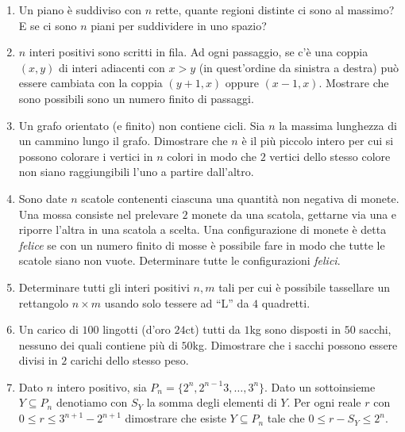 \documentclass[a4paper,10pt]{article}
\begin{document}
\begin{enumerate}
	Nel mese di gennaio, lo gnomo Gennaio va a trovare tutti i suoi amici.  Se nota che la maggioranza stretta dei suoi amici ha la casetta di un colore diverso dalla sua, allora entro la fine del mese egli ridipinge la sua casetta, cambiando il colore per ``adeguarsi alla maggioranza degli altri''.

	Nel mese di febbraio, tocca allo gnomo Febbraio fare visita ai suoi amici ed eventualmente ridipingere la casetta per ``adeguarsi alla maggioranza'', e cos\`{\i} via.

	Questa procedura si ripete di anno in anno.  Si dimostri che, da un certo momento in poi, nessuno gnomo avr\`{a} pi\`{u} bisogno di ridipingere la sua casetta (si supponga l'amicizia simmetrica, e che ogni gnomo non includa se stesso nella lista dei suoi amici).

	\item Un piano \`e suddiviso con $n$ rette, quante regioni distinte ci sono al massimo? E se ci sono $n$ piani per suddividere in uno spazio?

	\item $n$ interi positivi sono scritti in fila. Ad ogni passaggio, se c'\`e una coppia $(x,y)$ di interi adiacenti con $x>y$ (in quest'ordine da sinistra a destra) pu\`o essere cambiata con la coppia $(y+1,x)$ oppure $(x-1,x)$. Mostrare che sono possibili sono un numero finito di passaggi.

	\item Un grafo orientato (e finito) non contiene cicli. Sia $n$ la massima lunghezza di un cammino lungo il grafo. Dimostrare che $n$ \`e il pi\`u piccolo intero per cui si possono colorare i vertici in $n$ colori in modo che $2$ vertici dello stesso colore non siano raggiungibili l'uno a partire dall'altro.

	\item Sono date $n$ scatole contenenti ciascuna una quantit\`a non negativa di monete. Una mossa consiste nel prelevare $2$ monete da una scatola, gettarne via una e riporre l'altra in una scatola a scelta. Una configurazione di monete \`e detta \textit{felice} se con un numero finito di mosse \`e possibile fare in modo che tutte le scatole siano non vuote. Determinare tutte le configurazioni \textit{felici}.
	
	\item Determinare tutti gli interi positivi $n,m$ tali per cui \`e possibile tassellare un rettangolo $n \times m$ usando solo tessere ad ``L'' da $4$ quadretti.

	\item Un carico di $100$ lingotti (d'oro $24$ct) tutti da $1$kg sono disposti in $50$ sacchi, nessuno dei quali contiene pi\`u di $50$kg. Dimostrare che i sacchi possono essere divisi in $2$ carichi dello stesso peso.

	\item Dato $n$ intero positivo, sia $P_n=\{2^n,2^{n-1}3,\dots,3^n\}$. Dato un sottoinsieme $Y\subseteq P_n$ denotiamo con $S_Y$ la somma degli elementi di $Y$. Per ogni reale $r$ con $0\leq r \leq 3^{n+1} -	2^{n+1}$ dimostrare che esiste $Y\subseteq P_n$ tale che $0\leq r-S_Y \leq 2^n$.

\end{enumerate}
\bigskip\bigskip
\end{document}
